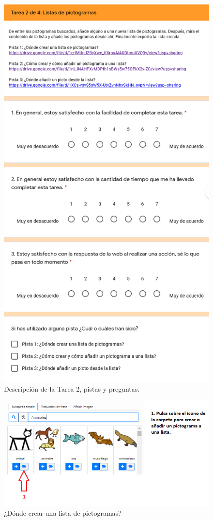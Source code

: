 \begin{figure}[h!]
	\centering
	\includegraphics[width=0.78\linewidth]{Imagenes/Bitmap/Tarea2Preguntas}
	\caption{Descripción de la Tarea 2, pistas y preguntas.}
	\label{fig:tarea2preguntas}
\end{figure}

\begin{figure}[h!]
	\centering
	\includegraphics[width=0.7\linewidth]{Imagenes/Bitmap/Tarea2-Pista1}
	\caption{¿Dónde crear una lista de pictogramas?}
	\label{fig:tarea2-pista1}
\end{figure}

